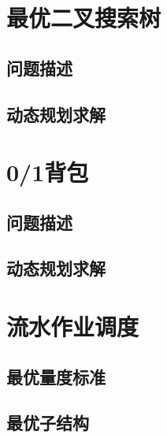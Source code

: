 \section{最优二叉搜索树}
\subsection*{问题描述}
\subsection*{动态规划求解}
\section{0/1背包}
\subsection*{问题描述}
\subsection*{动态规划求解}
\section{流水作业调度}
\subsection*{最优量度标准}
\subsection*{最优子结构}
